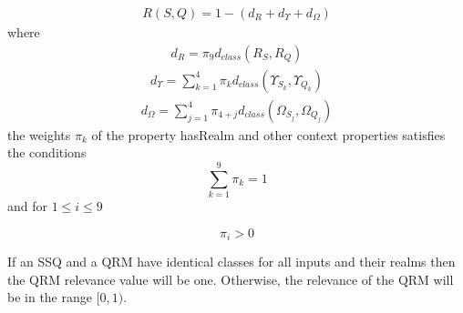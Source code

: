 \begin{eqnarray}
\label{qrmsimilarity}
 R(S,Q) = 1 - (d_{R} + d_{\Upsilon} + d_{\Omega})
\end{eqnarray}
\noindent where 
\begin{eqnarray}
d_{R} = \pi_9 d_{class}(R_S,R_Q) \nonumber
\end{eqnarray}
\begin{eqnarray}
d_{\Upsilon}  = \sum_{k=1}^4 {\pi_k} {d_{class}(\Upsilon_{S_k},\Upsilon_{Q_k})} \nonumber
\end{eqnarray}
\begin{eqnarray}
 d_{\Omega} = \sum_{j=1}^4 \pi_{4+j} d_{class}(\Omega_{S_j},\Omega_{Q_j})  \nonumber
\end{eqnarray}
\noindent the weights ${\pi}_k$ of the property hasRealm and other context properties satisfies the conditions 
\begin{equation}
\label{piconstraint1}
\sum_{k=1}^{9} {{\pi}_k} = 1
\end{equation}
\noindent and for $1 \leq i \leq 9$

\begin{equation}
\label{piconstraint2}
{\pi}_i > 0
\end{equation}

If an SSQ and a QRM have identical classes for all inputs and their
realms then the QRM relevance value will be one. Otherwise, the
relevance of the QRM will be in the range $[0, 1)$. 

